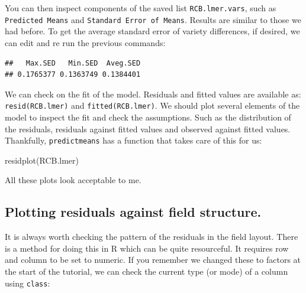\documentclass[
]{book}
\newenvironment{Shaded}{\begin{snugshade}}{\end{snugshade}}
\newcommand{\AttributeTok}[1]{\textcolor[rgb]{0.77,0.63,0.00}{#1}}
\newcommand{\FunctionTok}[1]{\textcolor[rgb]{0.00,0.00,0.00}{#1}}
\newcommand{\NormalTok}[1]{#1}
\newcommand{\SpecialCharTok}[1]{\textcolor[rgb]{0.00,0.00,0.00}{#1}}
\newcommand{\StringTok}[1]{\textcolor[rgb]{0.31,0.60,0.02}{#1}}
\begin{document}
You can then inspect components of the saved list \texttt{RCB.lmer.vars}, such as \texttt{Predicted\ Means} and \texttt{Standard\ Error\ of\ Means}. Results are similar to those we had before. To get the average standard error of variety differences, if desired, we can edit and re run the previous commands:

\begin{Shaded}
\end{Shaded}

\begin{verbatim}
##   Max.SED   Min.SED  Aveg.SED 
## 0.1765377 0.1363749 0.1384401
\end{verbatim}

We can check on the fit of the model. Residuals and fitted values are available as:
\texttt{resid(RCB.lmer)} and \texttt{fitted(RCB.lmer)}. We should plot several elements of the model to inspect the fit and check the assumptions. Such as the distribution of the residuals, residuals against fitted values and observed against fitted values. Thankfully, \texttt{predictmeans} has a function that takes care of this for us:

\begin{Shaded}
\begin{Highlighting}[]
\FunctionTok{residplot}\NormalTok{(RCB.lmer)}
\end{Highlighting}
\end{Shaded}

All these plots look acceptable to me.

\hypertarget{plotting-residuals-against-field-structure.}{%
\subsection{Plotting residuals against field structure.}\label{plotting-residuals-against-field-structure.}}

It is always worth checking the pattern of the residuals in the field layout. There is a method for doing this in R which can be quite resourceful. It requires row and column to be set to numeric. If you remember we changed these to factors at the start of the tutorial, we can check the current type (or mode) of a column using \texttt{class}:
\end{document}
